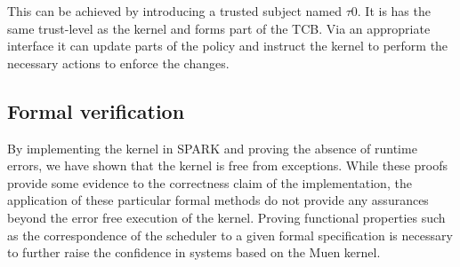 This can be achieved by introducing a trusted subject named $\tau$0. It is has
the same trust-level as the kernel and forms part of the TCB. Via an appropriate
interface it can update parts of the policy and instruct the kernel to perform
the necessary actions to enforce the changes.

\subsection{Formal verification}
By implementing the kernel in SPARK and proving the absence of runtime errors,
we have shown that the kernel is free from exceptions. While these proofs
provide some evidence to the correctness claim of the implementation, the
application of these particular formal methods do not provide any assurances
beyond the error free execution of the kernel. Proving functional properties
such as the correspondence of the scheduler to a given formal specification is
necessary to further raise the confidence in systems based on the Muen kernel.
